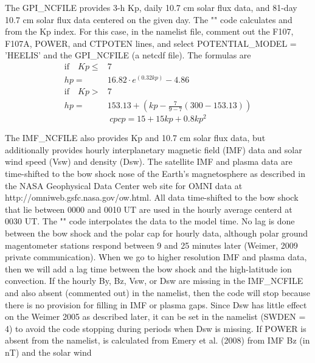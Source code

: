 \begin{enumerate}
\begin{enumerate}
\begin{enumerate}
The GPI_NCFILE provides 3-h Kp, daily 10.7 cm solar flux data, and 81-day
10.7 cm solar flux data centered on the given day.  The ""
code calculates  and  from the Kp index. For this case,
in the namelist file, comment out the F107, F107A, POWER, and CTPOTEN
lines, and select POTENTIAL_MODEL = 'HEELIS' and the GPI_NCFILE (a netcdf file).
The formulas are
 \cite{zhang2008}
%
\begin{equation}
  \begin{split}
      \text{if} \quad Kp \leq & 7 \\
                     hp =&  16.82 \cdot e^{(0.32 kp)} - 4.86 \\
      \text{if} \quad Kp >&  7 \\
                     hp =& 153.13 + (kp- \frac{7}{9-7}(300-153.13))
   \end{split}
    \label{eq:maginp_1}
\end{equation}
%
\begin{equation}
  cpcp = 15 + 15 kp + 0.8 kp^2
    \label{eq:maginp_2}
\end{equation}
% 
\end{enumerate}
%
The IMF_NCFILE also provides Kp and 10.7 cm solar flux data, but additionally
provides hourly interplanetary magnetic field (IMF) data and solar wind speed
(Vsw) and density (Dsw).  The satellite IMF and plasma data are time-shifted
to the bow shock nose of the Earth's magnetosphere as described in the
NASA Geophysical Data Center web site for OMNI data at
http://omniweb.gsfc.nasa.gov/ow.html.  All data time-shifted to the bow
shock that lie between 0000 and 0010 UT are used in the hourly average
centerd at 0030 UT.  The "" code interpolates the data
to the model time.  No lag is done between the bow shock and the polar
cap for hourly data, although polar ground magentometer stations respond
between 9 and 25 minutes later (Weimer, 2009 private communication).
When we go to higher resolution IMF and plasma data, then we will add a
lag time between the bow shock and the high-latitude ion convection.
%
If the hourly By, Bz, Vsw, or Dsw are missing in the IMF_NCFILE and
also absent (commented out) in the namelist, then the code will stop
because there is no provision for filling in IMF or plasma gaps.
Since Dsw has little effect on the Weimer 2005  as described later,
it can be set in the namelist (SWDEN = 4) to avoid the code stopping during
periods when Dsw is missing.
%
If POWER is absent from the namelist,  is calculated from
Emery et al. (2008) \cite{Emery2008} from IMF Bz (in nT) and the solar wind

\end{enumerate}
\end{enumerate}

